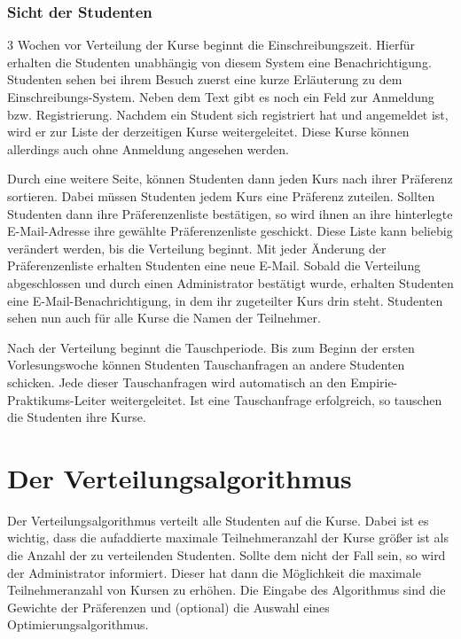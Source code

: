 \documentclass[12pt,a4paper]{article}
\begin{document}
            \subsubsection{Sicht der Studenten}
            3 Wochen vor Verteilung der Kurse beginnt die Einschreibungszeit. Hierfür erhalten die Studenten unabhängig von diesem System eine Benachrichtigung.
            Studenten sehen bei ihrem Besuch zuerst eine kurze Erläuterung zu dem Einschreibungs-System. Neben dem Text gibt es noch ein Feld zur Anmeldung bzw. Registrierung.
            Nachdem ein Student sich registriert hat und angemeldet ist, wird er zur Liste der derzeitigen Kurse weitergeleitet. Diese Kurse können allerdings auch ohne Anmeldung angesehen werden. %
            
            Durch eine weitere Seite, können Studenten dann jeden Kurs nach ihrer Präferenz sortieren. Dabei müssen Studenten jedem Kurs eine Präferenz zuteilen. Sollten Studenten dann ihre Präferenzenliste bestätigen, so wird ihnen an ihre hinterlegte E-Mail-Adresse ihre gewählte Präferenzenliste geschickt. Diese Liste kann beliebig verändert werden, bis die Verteilung beginnt. Mit jeder Änderung der Präferenzenliste erhalten Studenten eine neue E-Mail. %
            Sobald die Verteilung abgeschlossen und durch einen Administrator bestätigt wurde, erhalten Studenten eine E-Mail-Benachrichtigung, in dem ihr zugeteilter Kurs drin steht.
            Studenten sehen nun auch für alle Kurse die Namen der Teilnehmer.
            
            Nach der Verteilung beginnt die Tauschperiode. Bis zum Beginn der ersten Vorlesungswoche können Studenten Tauschanfragen an andere Studenten schicken. Jede dieser Tauschanfragen wird automatisch an den Empirie-Praktikums-Leiter weitergeleitet.
            Ist eine Tauschanfrage erfolgreich, so tauschen die Studenten ihre Kurse.
    
    \section{Der Verteilungsalgorithmus}
    Der Verteilungsalgorithmus verteilt alle Studenten auf die Kurse. Dabei ist es wichtig, dass die aufaddierte maximale Teilnehmeranzahl der Kurse größer ist als die Anzahl der zu verteilenden Studenten. Sollte dem nicht der Fall sein, so wird der Administrator informiert. Dieser hat dann die Möglichkeit die maximale Teilnehmeranzahl von Kursen zu erhöhen.
    Die Eingabe des Algorithmus sind die Gewichte der Präferenzen und (optional) die Auswahl eines Optimierungsalgorithmus.
    
\end{document}
